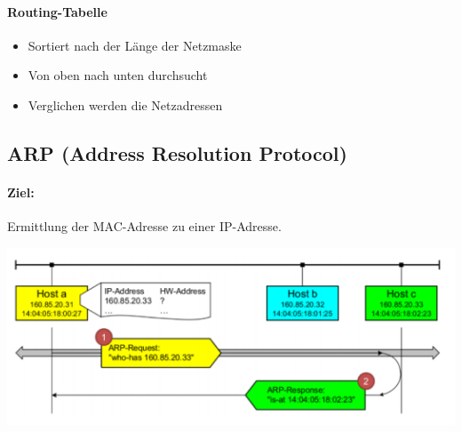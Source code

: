 \paragraph{ Routing-Tabelle}
{
    \begin{itemize}[noitemsep]
        \item Sortiert nach der Länge der Netzmaske
        \item Von oben nach unten durchsucht
        \item Verglichen werden die Netzadressen
    \end{itemize}
}

\subsection{ARP (Address Resolution Protocol)}

\paragraph{Ziel:}  Ermittlung der MAC-Adresse zu einer IP-Adresse.

\includegraphics[scale=0.45]{img/arp.png}




